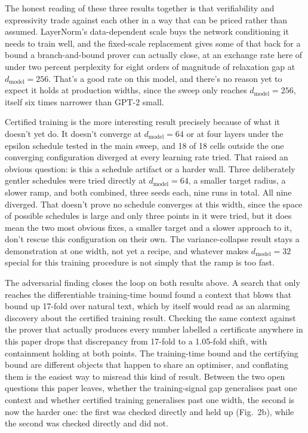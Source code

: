 \documentclass[sn-nature,pdflatex]{sn-jnl}
\begin{document}
The honest reading of these three results together is that verifiability and expressivity trade against each other in a way that can be priced rather than assumed. LayerNorm's data-dependent scale buys the network conditioning it needs to train well, and the fixed-scale replacement gives some of that back for a bound a branch-and-bound prover can actually close, at an exchange rate here of under two percent perplexity for eight orders of magnitude of relaxation gap at $d_{\text{model}}=256$. That's a good rate on this model, and there's no reason yet to expect it holds at production widths, since the sweep only reaches $d_{\text{model}}=256$, itself six times narrower than GPT-2 small.

Certified training is the more interesting result precisely because of what it doesn't yet do. It doesn't converge at $d_{\text{model}}=64$ or at four layers under the epsilon schedule tested in the main sweep, and 18 of 18 cells outside the one converging configuration diverged at every learning rate tried. That raised an obvious question: is this a schedule artifact or a harder wall. Three deliberately gentler schedules were tried directly at $d_{\text{model}}=64$, a smaller target radius, a slower ramp, and both combined, three seeds each, nine runs in total. All nine diverged. That doesn't prove no schedule converges at this width, since the space of possible schedules is large and only three points in it were tried, but it does mean the two most obvious fixes, a smaller target and a slower approach to it, don't rescue this configuration on their own. The variance-collapse result stays a demonstration at one width, not yet a recipe, and whatever makes $d_{\text{model}}=32$ special for this training procedure is not simply that the ramp is too fast.

The adversarial finding closes the loop on both results above. A search that only reaches the differentiable training-time bound found a context that blows that bound up 17-fold over natural text, which by itself would read as an alarming discovery about the certified training result. Checking the same context against the prover that actually produces every number labelled a certificate anywhere in this paper drops that discrepancy from 17-fold to a 1.05-fold shift, with containment holding at both points. The training-time bound and the certifying bound are different objects that happen to share an optimiser, and conflating them is the easiest way to misread this kind of result. Between the two open questions this paper leaves, whether the training-signal gap generalises past one context and whether certified training generalises past one width, the second is now the harder one: the first was checked directly and held up (Fig.~2b), while the second was checked directly and did not.
\end{document}
